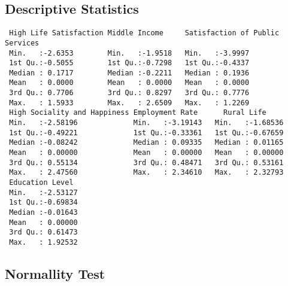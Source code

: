 \documentclass[12pt,twoside]{deuthesis}
\newenvironment{Shaded}{\begin{snugshade}}{\end{snugshade}}
\newcommand{\FunctionTok}[1]{\textcolor[rgb]{0.00,0.00,0.00}{#1}}
\newcommand{\NormalTok}[1]{#1}
\newcommand{\OtherTok}[1]{\textcolor[rgb]{0.56,0.35,0.01}{#1}}
\newcommand{\SpecialCharTok}[1]{\textcolor[rgb]{0.00,0.00,0.00}{#1}}
\newcommand{\StringTok}[1]{\textcolor[rgb]{0.31,0.60,0.02}{#1}}
\begin{document}
\hypertarget{descriptive-statistics}{%
\subsection{Descriptive Statistics}\label{descriptive-statistics}}
\begin{Shaded}
\end{Shaded}
\begin{verbatim}
 High Life Satisfaction Middle Income     Satisfaction of Public Services
 Min.   :-2.6353        Min.   :-1.9518   Min.   :-3.9997                
 1st Qu.:-0.5055        1st Qu.:-0.7298   1st Qu.:-0.4337                
 Median : 0.1717        Median :-0.2211   Median : 0.1936                
 Mean   : 0.0000        Mean   : 0.0000   Mean   : 0.0000                
 3rd Qu.: 0.7706        3rd Qu.: 0.8297   3rd Qu.: 0.7776                
 Max.   : 1.5933        Max.   : 2.6509   Max.   : 1.2269                
 High Sociality and Happiness Employment Rate      Rural Life      
 Min.   :-2.58196             Min.   :-3.19143   Min.   :-1.68536  
 1st Qu.:-0.49221             1st Qu.:-0.33361   1st Qu.:-0.67659  
 Median :-0.08242             Median : 0.09335   Median : 0.01165  
 Mean   : 0.00000             Mean   : 0.00000   Mean   : 0.00000  
 3rd Qu.: 0.55134             3rd Qu.: 0.48471   3rd Qu.: 0.53161  
 Max.   : 2.47560             Max.   : 2.34610   Max.   : 2.32793  
 Education Level   
 Min.   :-2.53127  
 1st Qu.:-0.69834  
 Median :-0.01643  
 Mean   : 0.00000  
 3rd Qu.: 0.61473  
 Max.   : 1.92532  
\end{verbatim}
\hypertarget{normallity-test}{%
\subsection{Normallity Test}\label{normallity-test}}
\end{document}
